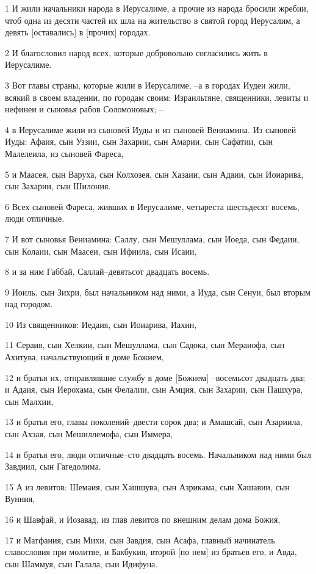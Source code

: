 \par 1 И жили начальники народа в Иерусалиме, а прочие из народа бросили жребии, чтоб одна из десяти частей их шла на жительство в святой город Иерусалим, а девять [оставались] в [прочих] городах.
\par 2 И благословил народ всех, которые добровольно согласились жить в Иерусалиме.
\par 3 Вот главы страны, которые жили в Иерусалиме, --а в городах Иудеи жили, всякий в своем владении, по городам своим: Израильтяне, священники, левиты и нефинеи и сыновья рабов Соломоновых; --
\par 4 в Иерусалиме жили из сыновей Иуды и из сыновей Вениамина. Из сыновей Иуды: Афаия, сын Уззии, сын Захарии, сын Амарии, сын Сафатии, сын Малелеила, из сыновей Фареса,
\par 5 и Маасея, сын Варуха, сын Колхозея, сын Хазаии, сын Адаии, сын Иоиарива, сын Захарии, сын Шилония.
\par 6 Всех сыновей Фареса, живших в Иерусалиме, четыреста шестьдесят восемь, люди отличные.
\par 7 И вот сыновья Вениамина: Саллу, сын Мешуллама, сын Иоеда, сын Федаии, сын Колаии, сын Маасеи, сын Ифиила, сын Исаии,
\par 8 и за ним Габбай, Саллай--девятьсот двадцать восемь.
\par 9 Иоиль, сын Зихри, был начальником над ними, а Иуда, сын Сенуи, был вторым над городом.
\par 10 Из священников: Иедаия, сын Иоиарива, Иахин,
\par 11 Сераия, сын Хелкии, сын Мешуллама, сын Садока, сын Мераиофа, сын Ахитува, начальствующий в доме Божием,
\par 12 и братья их, отправлявшие службу в доме [Божием] --восемьсот двадцать два; и Адаия, сын Иерохама, сын Фелалии, сын Амция, сын Захарии, сын Пашхура, сын Малхии,
\par 13 и братья его, главы поколений--двести сорок два; и Амашсай, сын Азариила, сын Ахзая, сын Мешиллемофа, сын Иммера,
\par 14 и братья его, люди отличные--сто двадцать восемь. Начальником над ними был Завдиил, сын Гагедолима.
\par 15 А из левитов: Шемаия, сын Хашшува, сын Азрикама, сын Хашавии, сын Вунния,
\par 16 и Шавфай, и Иозавад, из глав левитов по внешним делам дома Божия,
\par 17 и Матфания, сын Михи, сын Завдия, сын Асафа, главный начинатель славословия при молитве, и Бакбукия, второй [по нем] из братьев его, и Авда, сын Шаммуя, сын Галала, сын Идифуна.

